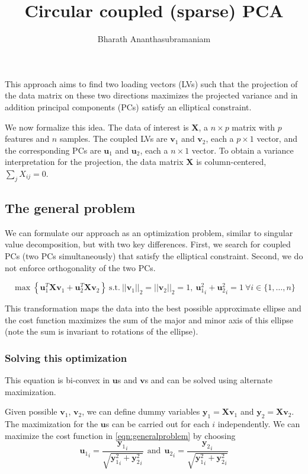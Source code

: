 \documentclass[10pt,a4paper]{article}
\author{Bharath Ananthasubramaniam}
\title{Circular coupled (sparse) PCA}
\begin{document}
\maketitle
This approach aims to find two loading vectors (LVs) such that the projection of the data matrix  on these two directions maximizes the projected variance and in addition principal components (PCs) satisfy an elliptical constraint.

We now formalize this idea. The data of interest is $\textbf{X}$, a $n\times p$ matrix with $p$ features and $n$ samples. The coupled LVs are $\textbf{v}_1$ and $\textbf{v}_2$, each a $p\times 1$ vector, and the corresponding PCs are $\textbf{u}_1$ and $\textbf{u}_2$, each a $n \times 1$ vector. To obtain a variance interpretation for the projection, the data matrix $\textbf{X}$ is column-centered, $\sum_j X_{ij} = 0$.

\subsection*{The general problem}

We can formulate our approach as an optimization problem, similar to singular value decomposition, but with two key differences. First, we search for coupled PCs (two PCs simultaneously) that satisfy the elliptical constraint. Second, we do not enforce orthogonality of the two PCs.

\begin{equation}
\max \left\{ \textbf{u}_1^T \textbf{X} \textbf{v}_1 + \textbf{u}_2^T \textbf{X} \textbf{v}_2\right\} ~\textrm{s.t.}~ ||\textbf{v}_1||_2 = ||\textbf{v}_2||_2=1,~ {\textbf{u}_1^2}_i + {\textbf{u}_2^2}_i = 1~ \forall i\in \{1,\ldots,n\}
\label{eqn:generalproblem}
\end{equation}

This transformation maps the data into the best possible approximate ellipse and the cost function maximizes the sum of the major and minor axis of this ellipse (note the sum is invariant to rotations of the ellipse).

\subsubsection*{Solving this optimization}
This equation is bi-convex in $\textbf{u}$s and $\textbf{v}$s  and can be solved using alternate maximization.

Given possible $\textbf{v}_1$, $\textbf{v}_2$, we can define dummy variables $\textbf{y}_1 = \textbf{X}\textbf{v}_1$ and $\textbf{y}_2 = \textbf{X}\textbf{v}_2$. The maximization for the $\textbf{u}$s can be carried out for each $i$ independently. We can maximize the cost function in \eqref{eqn:generalproblem} by choosing
\begin{equation}
{\textbf{u}_1}_i = \frac{{\textbf{y}_1}_i}{\sqrt{{\textbf{y}_1^2}_i + {\textbf{y}_2^2}_i}} ~~\textrm{and}~~ {\textbf{u}_2}_i = \frac{{\textbf{y}_2}_i}{\sqrt{{\textbf{y}_1^2}_i + {\textbf{y}_2^2}_i}}
\label{eqn:solve_u}
\end{equation}
\end{document}
